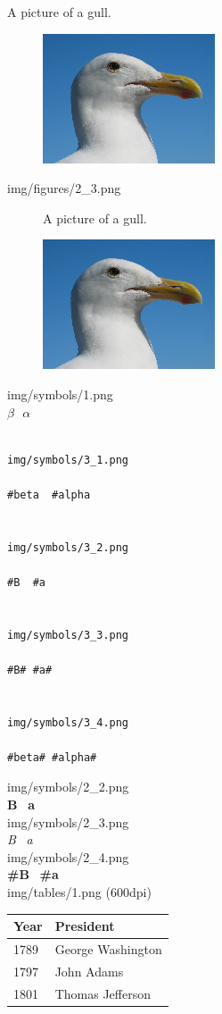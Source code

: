 \documentclass[14pt]{article}
\begin{document}
A picture of a gull.
\begin{figure}[H]
\includegraphics[scale=1]{../../img/gull.png}
\end{figure}
\newpage
\noindent
img/figures/2\_3.png\\[.5cm]
\begin{figure}[H]
\begin{center}
\fontsize{14}{14}\selectfont
A picture of a gull.\\
\setlength{\itemsep}{12pt}
\setlength{\parskip}{12pt}
\setlength{\parsep}{12pt}

\includegraphics[scale=1]{../../img/gull.png}
\end{center}
\end{figure}
\noindent
img/symbols/1.png\\[.5cm]
$\beta\ \ \  \alpha$
\begin{verbatim}

img/symbols/3_1.png

#beta  #alpha


img/symbols/3_2.png

#B  #a


img/symbols/3_3.png

#B# #a#


img/symbols/3_4.png

#beta# #alpha#

\end{verbatim}
\noindent
img/symbols/2\_2.png\\[.5cm]
\textbf{B} \ \textbf{a}\\[.5cm]
img/symbols/2\_3.png\\[.5cm]
\textit{B} \ \textit{a}\\[.5cm]
img/symbols/2\_4.png\\[.5cm]
\textbf{\#B} \ \textbf{\#a}\\[1cm]
img/tables/1.png (600dpi)
\begin{table}[H]
\begin{tabular}{| l | l |}
\hline
Year & President \\
\hline
1789 & George Washington \\
\hline
1797 & John Adams\\
\hline
1801 & Thomas Jefferson\\
\hline
\end{tabular}
\end{table}
\end{document}
